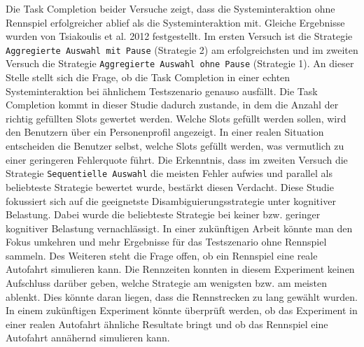 \documentclass[12pt,a4paper]{scrartcl}
\begin{document}
Die Task Completion beider Versuche zeigt, dass die Systeminteraktion ohne Rennspiel erfolgreicher ablief als die Systeminteraktion mit. Gleiche Ergebnisse wurden von Tsiakoulis et al. 2012 festgestellt. Im ersten Versuch ist die Strategie \texttt{Aggregierte Auswahl mit Pause} (Strategie 2) am erfolgreichsten und im zweiten Versuch die Strategie \texttt{Aggregierte Auswahl ohne Pause} (Strategie 1). An dieser Stelle stellt sich die Frage, ob die Task Completion in einer echten Systeminteraktion bei ähnlichem Testszenario genauso ausfällt. Die Task Completion kommt in dieser Studie dadurch zustande, in dem die Anzahl der richtig gefüllten Slots gewertet werden. Welche Slots gefüllt werden sollen, wird den Benutzern über ein Personenprofil angezeigt. In einer realen Situation entscheiden die Benutzer selbst, welche Slots gefüllt werden, was vermutlich zu einer geringeren Fehlerquote führt. Die Erkenntnis, dass im zweiten Versuch die Strategie \texttt{Sequentielle Auswahl} die meisten Fehler aufwies und parallel als beliebteste Strategie bewertet wurde, bestärkt diesen Verdacht. 
\newline
\newline
Diese Studie fokussiert sich auf die geeignetste Disambiguierungsstrategie unter kognitiver Belastung. Dabei wurde die beliebteste Strategie bei keiner bzw. geringer kognitiver Belastung vernachlässigt. In einer zukünftigen Arbeit könnte man den Fokus umkehren und mehr Ergebnisse für das Testszenario ohne Rennspiel sammeln. 
Des Weiteren steht die Frage offen, ob ein Rennspiel eine reale Autofahrt simulieren kann. Die Rennzeiten konnten in diesem Experiment keinen Aufschluss darüber geben, welche Strategie am wenigsten bzw. am meisten ablenkt. Dies könnte daran liegen, dass die Rennstrecken zu lang gewählt wurden. In einem zukünftigen Experiment könnte überprüft werden, ob das Experiment in einer realen Autofahrt ähnliche Resultate bringt und ob das Rennspiel eine Autofahrt annähernd simulieren kann.
\end{document}
